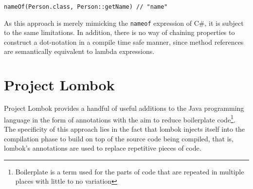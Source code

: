 \begin{verbatim}
nameOf(Person.class, Person::getName) // "name"
\end{verbatim}

As this approach is merely mimicking the \texttt{nameof} expression of C\#, it is subject to the same limitations. In addition, there is no way of chaining properties to construct a dot-notation in a compile time safe manner, since method references are semantically equivalent to lambda expressions.

\section{Project Lombok}
Project Lombok \cite{lombok} provides a handful of useful additions to the Java programming language in the form of annotations with the aim to reduce boilerplate code\footnote{Boilerplate is a term used for the parts of code that are repeated in multiple places with little to no variation}.
The specificity of this approach lies in the fact that lombok injects itself into the compilation phase to build on top of the source code being compiled, that is, lombok’s annotations are used to replace repetitive pieces of code.

\n

